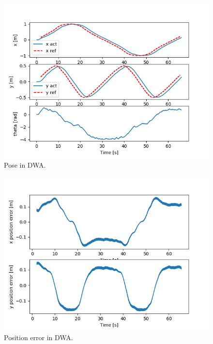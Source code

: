 \documentclass[11pt,a4paper]{article}
\begin{document}
\begin{figure}[H]
    \centering
    \includegraphics[scale=0.4]{dwa_screenshots/Pose.png}
    \caption{Pose in DWA.}
\end{figure}

\begin{figure}[H]
    \centering
    \includegraphics[scale=0.4]{dwa_screenshots/Position_Error.png}
    \caption{Position error in DWA.}
\end{figure}
\end{document}
